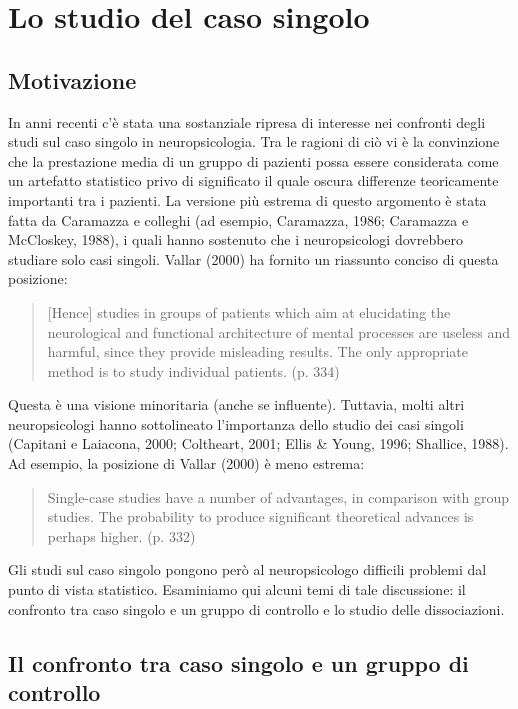 \chapter{Lo studio del caso singolo}
\label{ch:single_case}


\section*{Motivazione}

In anni recenti c'è stata una sostanziale ripresa di interesse nei confronti degli studi sul caso singolo in neuropsicologia. 
Tra le ragioni di ciò vi è la convinzione che la prestazione media di un gruppo di pazienti possa essere considerata come un artefatto statistico privo di significato il quale oscura  differenze teoricamente importanti tra i pazienti. 
La versione più estrema di questo argomento è stata fatta da Caramazza e colleghi (ad esempio, Caramazza, 1986; Caramazza e McCloskey, 1988), i quali hanno sostenuto che i neuropsicologi dovrebbero studiare solo casi singoli. 
Vallar (2000) ha fornito un riassunto conciso di questa posizione: 
\begin{quote}
[Hence] studies in groups of patients which aim at elucidating the neurological and functional architecture of mental processes are useless and harmful, since they provide misleading results. 
The only appropriate method is to study individual patients. (p. 334)
\end{quote}
Questa è una visione minoritaria (anche se influente).
Tuttavia, molti altri neuropsicologi hanno sottolineato l'importanza dello studio dei casi singoli (Capitani e Laiacona, 2000; Coltheart, 2001; Ellis \& Young, 1996; Shallice, 1988). 
Ad esempio, la posizione di Vallar (2000) è meno estrema:
\begin{quote}
Single-case studies have a number of advantages, in comparison with group studies. 
The probability to produce significant theoretical advances is perhaps higher. (p. 332)
\end{quote}

Gli studi sul caso singolo pongono però al neuropsicologo difficili problemi dal punto di vista statistico.
Esaminiamo qui alcuni temi di tale discussione: il confronto tra caso singolo e un gruppo di controllo e lo studio delle dissociazioni. 


\section{Il confronto tra caso singolo e un gruppo di controllo}
\label{sec:comparison_single_case_controls}

